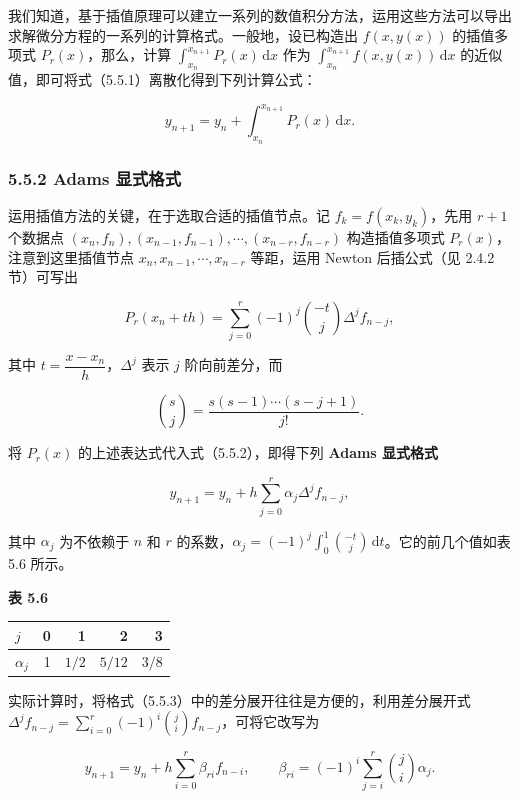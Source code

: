 \documentclass[
  10pt,
  fontset=fandol]{ctexart}
\newcounter{none} %
\begin{document}
我们知道，基于插值原理可以建立一系列的数值积分方法，运用这些方法可以导出求解微分方程的一系列的计算格式。一般地，设已构造出 \(f(x,y(x))\) 的插值多项式 \(P_r(x)\)，那么，计算 \(\int_{x_n}^{x_{n+1}}P_r(x)\,\mathrm dx\) 作为 \(\int_{x_n}^{x_{n+1}}f(x,y(x))\,\mathrm dx\) 的近似值，即可将式（5.5.1）离散化得到下列计算公式：

\[
y_{n+1}=y_n+\int_{x_n}^{x_{n+1}}P_r(x)\,\mathrm dx.
\tag{5.5.2}
\]

\subsubsection{5.5.2 Adams 显式格式}\label{adams-ux663eux5f0fux683cux5f0f}

运用插值方法的关键，在于选取合适的插值节点。记 \(f_k=f(x_k,y_k)\)，先用 \(r+1\) 个数据点 \((x_n,\allowbreak f_n),\allowbreak (x_{n-1},\allowbreak f_{n-1}),\allowbreak \cdots,\allowbreak (x_{n-r},\allowbreak f_{n-r})\) 构造插值多项式 \(P_r(x)\)，注意到这里插值节点 \(x_n,x_{n-1},\cdots,x_{n-r}\) 等距，运用 Newton 后插公式（见 2.4.2 节）可写出

\[
P_r(x_n+th)=\sum_{j=0}^r(-1)^j\binom{-t}{j}\Delta^j f_{n-j},
\]

其中 \(t=\dfrac{x-x_n}{h}\)，\(\Delta^j\) 表示 \(j\) 阶向前差分，而

\[
\binom sj=\frac{s(s-1)\cdots(s-j+1)}{j!}.
\]

将 \(P_r(x)\) 的上述表达式代入式（5.5.2），即得下列 \textbf{Adams 显式格式}

\[
y_{n+1}=y_n+h\sum_{j=0}^r\alpha_j\Delta^j f_{n-j},
\tag{5.5.3}
\]

其中 \(\alpha_j\) 为不依赖于 \(n\) 和 \(r\) 的系数，\(\alpha_j=(-1)^j\int_0^1\binom{-t}{j}\,\mathrm dt\)。它的前几个值如表 5.6 所示。

\textbf{表 5.6}

{\def\LTcaptype{none} %
\begin{longtable}[]{@{}lrrrr@{}}
\toprule\noalign{}
\(j\) & 0 & 1 & 2 & 3 \\
\midrule\noalign{}
\endhead
\bottomrule\noalign{}
\endlastfoot
\(\alpha_j\) & 1 & \(1/2\) & \(5/12\) & \(3/8\) \\
\end{longtable}
}

实际计算时，将格式（5.5.3）中的差分展开往往是方便的，利用差分展开式 \(\Delta^j f_{n-j}=\sum_{i=0}^r(-1)^i\binom ji f_{n-j}\)，可将它改写为

\[
y_{n+1}=y_n+h\sum_{i=0}^r\beta_{ri}f_{n-i},\qquad
\beta_{ri}=(-1)^i\sum_{j=i}^r\binom ji\alpha_j.
\tag{5.5.4}
\]
\end{document}
